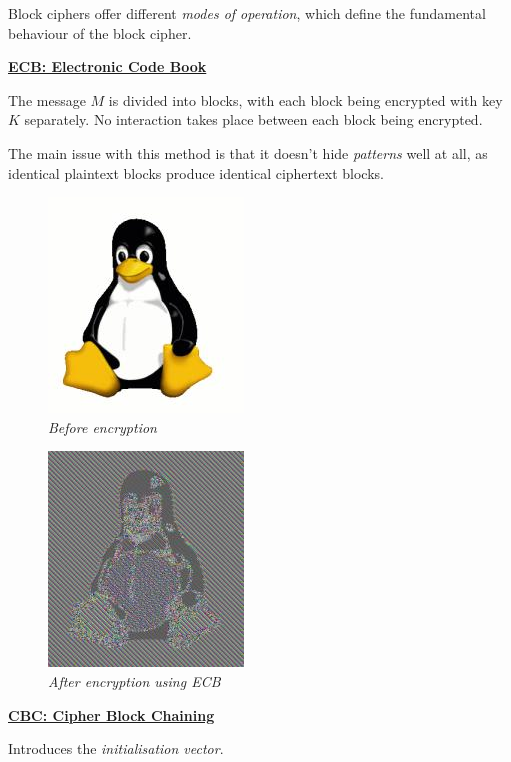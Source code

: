 \documentclass{article}
\begin{document}
Block ciphers offer different \textit{modes of operation}, which define the fundamental behaviour of the block cipher.

\textbf{\underline{ECB: Electronic Code Book}}

The message $M$ is divided into blocks, with each block being encrypted with key $K$ separately. No interaction takes place between each block being encrypted.

The main issue with this method is that it doesn't hide \textit{patterns} well at all, as identical plaintext blocks produce identical ciphertext blocks.

\begin{figure}[htb!]
  \begin{minipage}{0.5\linewidth}
    \centering
    \includegraphics[scale=0.4]{tux.jpg}\\
    \textit{Before encryption}
  \end{minipage}
  \begin{minipage}{0.5\linewidth}
    \centering
    \includegraphics[scale=0.4]{tuxecb.jpg}\\
    \textit{After encryption using ECB}
  \end{minipage}
\end{figure}

\newpage
\textbf{\underline{CBC: Cipher Block Chaining}}

Introduces the \textit{initialisation vector}.
\end{document}
